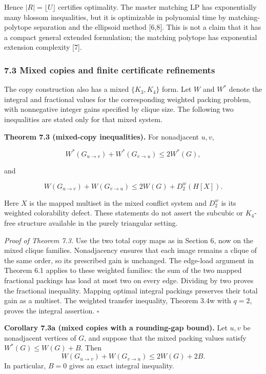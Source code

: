 \documentclass[english,11pt,a4paper]{article}
\begin{document}
Hence \(|R|=\lfloor U\rfloor\) certifies optimality. The master matching
LP has exponentially many blossom inequalities, but it is optimizable in
polynomial time by matching-polytope separation and the ellipsoid method
{[}6,8{]}. This is not a claim that it has a compact general extended
formulation; the matching polytope has exponential extension complexity
{[}7{]}.

\subsubsection{7.3 Mixed copies and finite certificate
refinements}\label{mixed-copies-and-finite-certificate-refinements}

The copy construction also has a mixed \(\{K_3,K_4\}\) form. Let \(W\)
and \(W^*\) denote the integral and fractional values for the
corresponding weighted packing problem, with nonnegative integer gains
specified by clique size. The following two inequalities are stated only
for that mixed system.

\textbf{Theorem 7.3 (mixed-copy inequalities).} For nonadjacent \(u,v\),

\[
W^*(G_{u\to v})+W^*(G_{v\to u})\le 2W^*(G),
\]

and

\[
W(G_{u\to v})+W(G_{v\to u})
\le 2W(G)+D_2^w(H[X]).
\]

Here \(X\) is the mapped multiset in the mixed conflict system and
\(D_2^w\) is its weighted colorability defect. These statements do not
assert the subcubic or \(K_4\)-free structure available in the purely
triangular setting.

\emph{Proof of Theorem 7.3.} Use the two total copy maps as in Section
6, now on the mixed clique families. Nonadjacency ensures that each
image remains a clique of the same order, so its prescribed gain is
unchanged. The edge-load argument in Theorem 6.1 applies to these
weighted families: the sum of the two mapped fractional packings has
load at most two on every edge. Dividing by two proves the fractional
inequality. Mapping optimal integral packings preserves their total gain
as a multiset. The weighted transfer inequality, Theorem 3.4w with
\(q=2\), proves the integral assertion. \(\square\)

\textbf{Corollary 7.3a (mixed copies with a rounding-gap bound).} Let
\(u,v\) be nonadjacent vertices of \(G\), and suppose that the mixed
packing values satisfy \(W^*(G)\le W(G)+B\). Then \[
W(G_{u\to v})+W(G_{v\to u})\le2W(G)+2B.
\] In particular, \(B=0\) gives an exact integral inequality.
\end{document}
